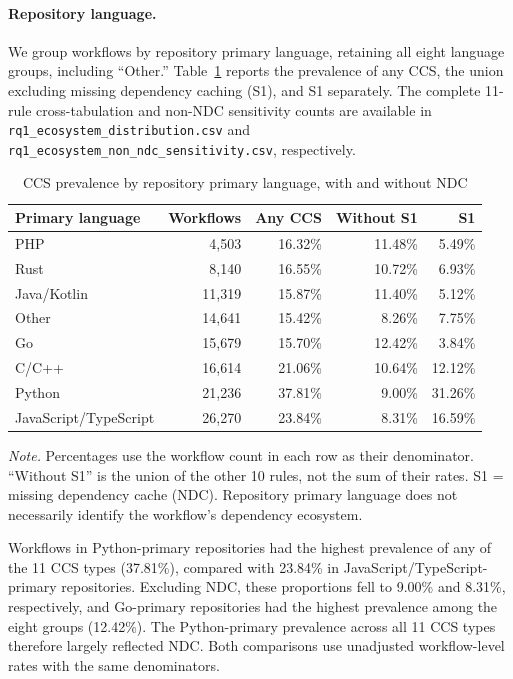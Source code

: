 \documentclass[smallextended]{svjour3}
\begin{document}
\paragraph{Repository language.}
We group workflows by repository primary language, retaining all eight language groups, including ``Other.'' Table~\ref{tab:ecosystem-distribution} reports the prevalence of any CCS, the union excluding missing dependency caching (S1), and S1 separately. The complete 11-rule cross-tabulation and non-NDC sensitivity counts are available in \texttt{rq1\_ecosystem\_distribution.csv} and \texttt{rq1\_ecosystem\_non\_ndc\_sensitivity.csv}, respectively.

\begin{table}[htbp]\caption{CCS prevalence by repository primary language, with and without NDC}\label{tab:ecosystem-distribution}\centering\small
\begin{tabular}{lrrrr}\hline
Primary language & Workflows & Any CCS & Without S1 & S1\\\hline
PHP & 4,503 & 16.32\% & 11.48\% & 5.49\% \\
Rust & 8,140 & 16.55\% & 10.72\% & 6.93\% \\
Java/Kotlin & 11,319 & 15.87\% & 11.40\% & 5.12\% \\
Other & 14,641 & 15.42\% & 8.26\% & 7.75\% \\
Go & 15,679 & 15.70\% & 12.42\% & 3.84\% \\
C/C++ & 16,614 & 21.06\% & 10.64\% & 12.12\% \\
Python & 21,236 & 37.81\% & 9.00\% & 31.26\% \\
JavaScript/TypeScript & 26,270 & 23.84\% & 8.31\% & 16.59\% \\\hline
\end{tabular}\par\smallskip\noindent\parbox{\linewidth}{\footnotesize\emph{Note.} Percentages use the workflow count in each row as their denominator. ``Without S1'' is the union of the other 10 rules, not the sum of their rates. S1 = missing dependency cache (NDC). Repository primary language does not necessarily identify the workflow's dependency ecosystem.}\end{table}

Workflows in Python-primary repositories had the highest prevalence of any of the 11 CCS types (37.81\%), compared with 23.84\% in JavaScript/TypeScript-primary repositories. Excluding NDC, these proportions fell to 9.00\% and 8.31\%, respectively, and Go-primary repositories had the highest prevalence among the eight groups (12.42\%). The Python-primary prevalence across all 11 CCS types therefore largely reflected NDC. Both comparisons use unadjusted workflow-level rates with the same denominators.
\end{document}
